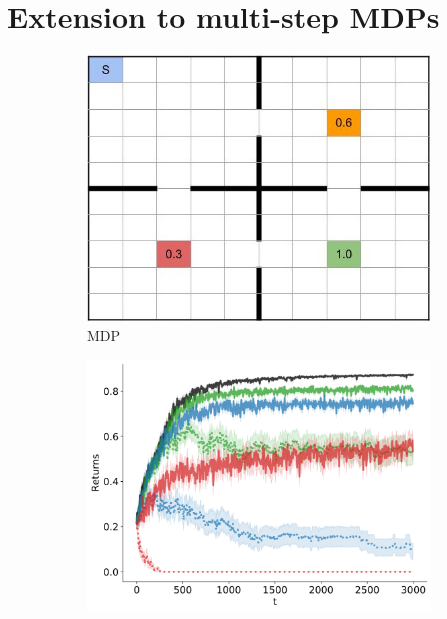 \section{Extension to multi-step MDPs}
\begin{figure}
\centering
 \begin{subfigure}[b]{0.21\linewidth}   
    \includegraphics[trim={0cm -0.8cm 0cm 0},clip,width=\textwidth]{articles/baselines/figs/paper/Four_rooms.jpg}
    \caption{MDP}
    \label{fig:4rooms_mdp}
  \end{subfigure}
  \begin{subfigure}[b]{0.25\linewidth}
    \includegraphics[width=\textwidth]{articles/baselines/figs/baseline_4rooms/NPG_returns.png}

\end{subfigure}
\end{figure}
